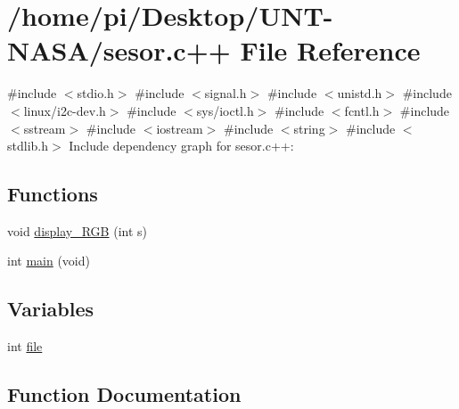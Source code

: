 \hypertarget{sesor_8c_09_09}{}\section{/home/pi/\+Desktop/\+U\+N\+T-\/\+N\+A\+S\+A/sesor.c++ File Reference}
\label{sesor_8c_09_09}
{\ttfamily \#include $<$stdio.\+h$>$}\newline
{\ttfamily \#include $<$signal.\+h$>$}\newline
{\ttfamily \#include $<$unistd.\+h$>$}\newline
{\ttfamily \#include $<$linux/i2c-\/dev.\+h$>$}\newline
{\ttfamily \#include $<$sys/ioctl.\+h$>$}\newline
{\ttfamily \#include $<$fcntl.\+h$>$}\newline
{\ttfamily \#include $<$sstream$>$}\newline
{\ttfamily \#include $<$iostream$>$}\newline
{\ttfamily \#include $<$string$>$}\newline
{\ttfamily \#include $<$stdlib.\+h$>$}\newline
Include dependency graph for sesor.\+c++\+:
\subsection*{Functions}
\begin{DoxyCompactItemize}
\item 
void \hyperlink{sesor_8c_09_09_af6d9d492718e5b567f2de33317908a60}{display\+\_\+\+R\+GB} (int s)
\item 
int \hyperlink{sesor_8c_09_09_a840291bc02cba5474a4cb46a9b9566fe}{main} (void)
\end{DoxyCompactItemize}
\subsection*{Variables}
\begin{DoxyCompactItemize}
\item 
int \hyperlink{sesor_8c_09_09_a6fb021f1c9bd6c7fc72f1c0f24b81b38}{file}
\end{DoxyCompactItemize}


\subsection{Function Documentation}
\mbox{\label{sesor_8c_09_09_af6d9d492718e5b567f2de33317908a60}} 
